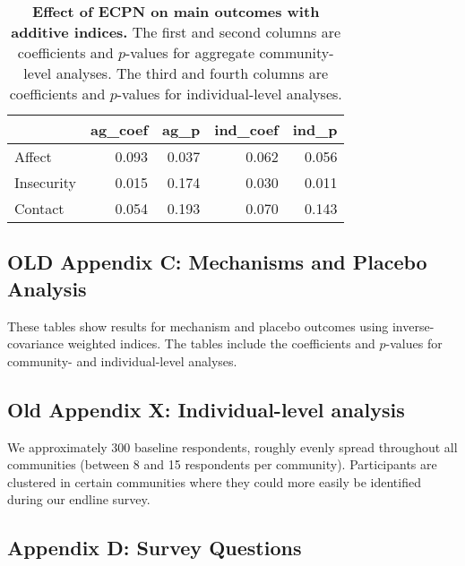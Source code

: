 \documentclass[
]{article}
\begin{document}
\begin{table}[H]
\begin{center}

\begin{tabular}{l|r|r|r|r}
\hline
  & ag\_coef & ag\_p & ind\_coef & ind\_p\\
\hline
Affect & 0.093 & 0.037 & 0.062 & 0.056\\
\hline
Insecurity & 0.015 & 0.174 & 0.030 & 0.011\\
\hline
Contact & 0.054 & 0.193 & 0.070 & 0.143\\
\hline
\end{tabular}


\caption{\label{tab:add_ind_tab}\textbf{Effect of ECPN on main outcomes with additive indices.} The first and second columns are coefficients and $p$-values for aggregate community-level analyses.  The third and fourth columns are coefficients and $p$-values for individual-level analyses.}
\end{center}
\end{table}

\hypertarget{old-appendix-c-mechanisms-and-placebo-analysis}{%
\subsection{OLD Appendix C: Mechanisms and Placebo
Analysis}\label{old-appendix-c-mechanisms-and-placebo-analysis}}

These tables show results for mechanism and placebo outcomes using
inverse-covariance weighted indices. The tables include the coefficients
and \(p\)-values for community- and individual-level analyses.

\hypertarget{old-appendix-x-individual-level-analysis}{%
\subsection{Old Appendix X: Individual-level
analysis}\label{old-appendix-x-individual-level-analysis}}

We approximately 300 baseline respondents, roughly evenly spread
throughout all communities (between 8 and 15 respondents per community).
Participants are clustered in certain communities where they could more
easily be identified during our endline survey.

\hypertarget{appendix-d-survey-questions}{%
\subsection{Appendix D: Survey
Questions}\label{appendix-d-survey-questions}}
\end{document}
